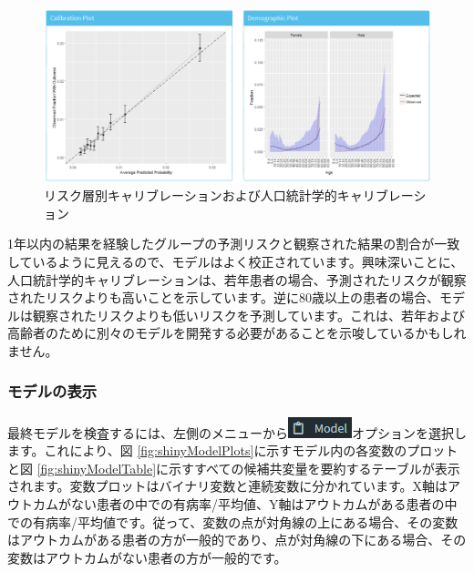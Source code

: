 \documentclass[
  11pt]{book}
\theoremstyle{definition}
\theoremstyle{definition}
\theoremstyle{definition}
\theoremstyle{definition}
\theoremstyle{remark}
\begin{document}
\begin{figure}

{\centering \includegraphics[width=1\linewidth]{images/PatientLevelPrediction/shiny/shinyPerformanceCal} 

}

\caption{リスク層別キャリブレーションおよび人口統計学的キャリブレーション}\label{fig:shinyPerformanceCal}
\end{figure}

1年以内の結果を経験したグループの予測リスクと観察された結果の割合が一致しているように見えるので、モデルはよく校正されています。興味深いことに、人口統計学的キャリブレーションは、若年患者の場合、予測されたリスクが観察されたリスクよりも高いことを示しています。逆に80歳以上の患者の場合、モデルは観察されたリスクよりも低いリスクを予測しています。これは、若年および高齢者のために別々のモデルを開発する必要があることを示唆しているかもしれません。

\subsubsection*{モデルの表示}\label{ux30e2ux30c7ux30ebux306eux8868ux793a}

最終モデルを検査するには、左側のメニューから\includegraphics{images/PatientLevelPrediction/modelButton.png}オプションを選択します。これにより、図 \ref{fig:shinyModelPlots}に示すモデル内の各変数のプロットと図 \ref{fig:shinyModelTable}に示すすべての候補共変量を要約するテーブルが表示されます。変数プロットはバイナリ変数と連続変数に分かれています。X軸はアウトカムがない患者の中での有病率/平均値、Y軸はアウトカムがある患者の中での有病率/平均値です。従って、変数の点が対角線の上にある場合、その変数はアウトカムがある患者の方が一般的であり、点が対角線の下にある場合、その変数はアウトカムがない患者の方が一般的です。
\end{document}
